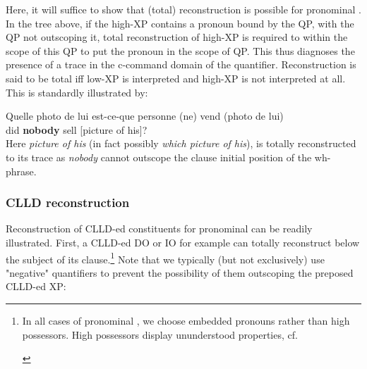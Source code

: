 \documentclass[output=paper]{langsci/langscibook}
\begin{document}
\ea
\z
%
Here, it will suffice to show that (total) reconstruction is possible for
pronominal . In the tree above, if the high-XP contains a pronoun bound
by the QP, with the QP not outscoping it, total reconstruction of high-XP is
required to within the scope of this QP to put the pronoun in the scope of QP.
This thus diagnoses the presence of a trace in the c-command domain of the
quantifier. Reconstruction is said to be total iff low-XP is interpreted and
high-XP is not interpreted at all.  This is standardly illustrated by:

\ea
    \gll Quelle {photo de lui} est-ce-que personne (ne) vend (photo de lui)\\
        [Which \sout{picture of his}\tss{\emph{k}}] did {\bf
        nobody} \hphantom{(}\Neg{} sell [picture of his]?\\
\z
%
Here {\it picture of his} (in fact possibly {\it which picture of his}), is
totally reconstructed to its trace as {\it nobody} cannot outscope the clause
initial position of the wh-phrase.

\subsubsection{CLLD reconstruction}

Reconstruction of \gls{CLLD}-ed constituents for pronominal  can be
readily illustrated. First, a \gls{CLLD}-ed DO or IO for example can totally
reconstruct below the subject of its clause.\footnote{In all cases of
    pronominal , we choose embedded pronouns rather than high
    possessors. High possessors display ununderstood properties, cf.\

\begin{exe}
    \begin{xlist}
    \end{xlist}
\end{exe}}
%
Note that we typically (but not exclusively) use "negative" quantifiers to
prevent the possibility of them outscoping the preposed \gls{CLLD}-ed XP:
\end{document}
